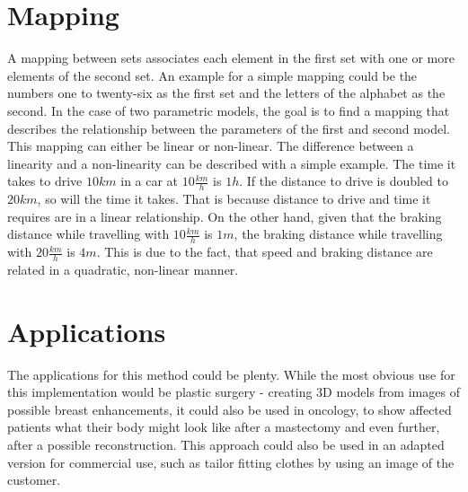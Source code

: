 \section{Mapping}
A mapping between sets associates each element in the first set with one or more elements of the second set. An example for a simple mapping could be the numbers one to twenty-six as the first set and the letters of the alphabet as the second. In the case of two parametric models, the goal is to find a mapping that describes the relationship between the parameters of the first and second model. \\
This mapping can either be linear or non-linear. The difference between a linearity and a non-linearity can be described with a simple example. The time it takes to drive $10km$ in a car at $10\frac{km}{h}$ is $1h$. If the distance to drive is doubled to $20km$, so will the time it takes. That is because distance to drive and time it requires are in a linear relationship. On the other hand, given that the braking distance while travelling with $10\frac{km}{h}$ is $1m$, the braking distance while travelling with $20\frac{km}{h}$ is $4m$. This is due to the fact, that speed and braking distance are related in a quadratic, non-linear manner.

\section{Applications}
The applications for this method could be plenty. While the most obvious use for this implementation would be plastic surgery - creating 3D models from images of possible breast enhancements, it could also be used in oncology, to show affected patients what their body might look like after a mastectomy and even further, after a possible reconstruction. This approach could also be used in an adapted version for commercial use, such as tailor fitting clothes by using an image of the customer.
